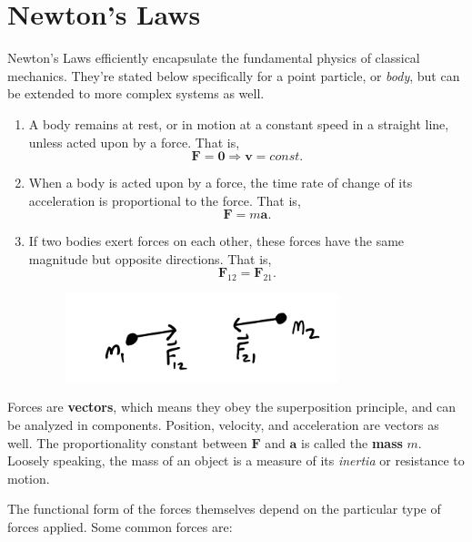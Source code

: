 \documentclass[
  letterpaper,
  DIV=11,
  numbers=noendperiod]{scrreprt}
\begin{document}
\hypertarget{newtons-laws}{%
\section{Newton's Laws}\label{newtons-laws}}

Newton's Laws efficiently encapsulate the fundamental physics of
classical mechanics. They're stated below specifically for a point
particle, or \emph{body}, but can be extended to more complex systems as
well.

\begin{enumerate}
\def\labelenumi{\arabic{enumi}.}
\item
  A body remains at rest, or in motion at a constant speed in a straight
  line, unless acted upon by a force. That is,\\
  \[
  \mathbf{F} = \mathbf{0} \Rightarrow \mathbf{v}=const.
  \]
\item
  When a body is acted upon by a force, the time rate of change of its
  acceleration is proportional to the force. That is, \[
  \mathbf{F} = m \mathbf{a}.
  \]
\item
  If two bodies exert forces on each other, these forces have the same
  magnitude but opposite directions. That is, \[
  \mathbf{F}_{12} = \mathbf{F}_{21}.
  \]

  \begin{figure}

  {\centering \includegraphics[width=3.125in,height=\textheight]{classical-mechanics/./resources/image-20230212035902274.png}

  }

  \end{figure}
\end{enumerate}

Forces are \textbf{vectors}, which means they obey the superposition
principle, and can be analyzed in components. Position, velocity, and
acceleration are vectors as well. The proportionality constant between
\(\mathbf{F}\) and \(\mathbf{a}\) is called the \textbf{mass }\(m\).
Loosely speaking, the mass of an object is a measure of its
\emph{inertia} or resistance to motion.

The functional form of the forces themselves depend on the particular
type of forces applied. Some common forces are:
\end{document}
